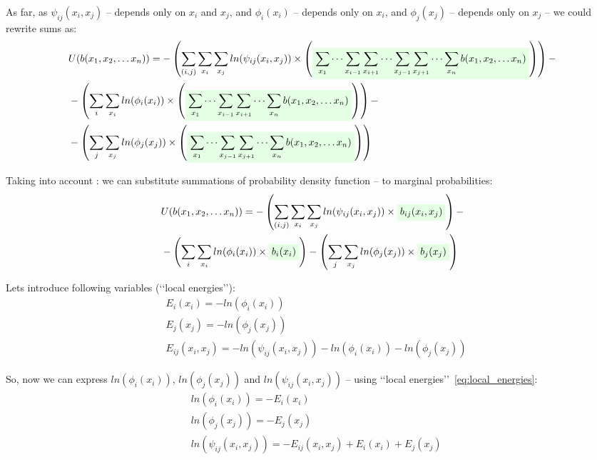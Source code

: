 \documentclass[fleqn,leqno]{article}
\newcommand{\highlight}[1]{\colorbox{green!10}{$\displaystyle#1$}}
\begin{document}
As far, as $\psi_{ij}(x_i, x_j)$ -- depends only on $x_i$ and $x_j$, and $\phi_{i}(x_i)$ -- depends only on $x_i$, and $\phi_{j}(x_j)$ -- depends only on $x_j$ -- we could rewrite sums as:
\begin{equation}
\begin{split}
   & U(b(x_1,x_2,\dots x_n)) = -\left( \sum_{(i, j)} \sum_{x_i} \sum_{x_j} ln(\psi_{ij}(x_i, x_j)) \times \left( \highlight{\sum_{x_1} \cdots \sum_{x_{i-1}} \sum_{x_{i+1}} \cdots \sum_{x_{j-1}} \sum_{x_{j+1}} \cdots \sum_{x_n}  b(x_1, x_2, \dots x_n)} \right) \right) - \\
   & -\left( \sum_{i} \sum_{x_i} ln(\phi_{i}(x_i)) \times \left( \highlight{\sum_{x_1} \cdots \sum_{x_{i-1}} \sum_{x_{i+1}} \cdots \sum_{x_n} b(x_1, x_2, \dots x_n)} \right) \right) - \\
   & -\left( \sum_{j} \sum_{x_j} ln(\phi_{j}(x_j)) \times \left( \highlight{\sum_{x_1} \cdots \sum_{x_{j-1}} \sum_{x_{j+1}} \cdots \sum_{x_n} b(x_1, x_2, \dots x_n)} \right) \right)
\end{split}
\end{equation}

Taking into account : we can substitute summations of probability density function -- to marginal probabilities:
\begin{equation}
\begin{split}
   & U(b(x_1,x_2,\dots x_n)) = -\left( \sum_{(i, j)} \sum_{x_i} \sum_{x_j} ln(\psi_{ij}(x_i, x_j)) \times \highlight{b_{ij}(x_i, x_j)} \right) - \\
   & -\left( \sum_{i} \sum_{x_i} ln(\phi_{i}(x_i)) \times \highlight{b_i(x_i)} \right) - \left( \sum_{j} \sum_{x_j} ln(\phi_{j}(x_j)) \times \highlight{b_j(x_j)} \right)
\end{split}
\end{equation}

Lets introduce following variables (\lq \lq local energies\rq \rq):
\begin{equation} \label{eq:local_energies}
\begin{split}
& E_i(x_i)    = -ln(\phi_i(x_i)) \\
& E_j(x_j)    = -ln(\phi_j(x_j)) \\
& E_{ij}(x_i, x_j) = -ln(\psi_{ij}(x_i, x_j)) -ln(\phi_i(x_i)) -ln(\phi_j(x_j))
\end{split}
\end{equation}

So, now we can express $ln(\phi_i(x_i))$, $ln(\phi_j(x_j))$ and $ln(\psi_{ij}(x_i, x_j))$ -- using \lq \lq local energies\rq \rq\ \eqref{eq:local_energies}:
\begin{equation} \label{eq:ln_potentials_as_local_energies}
\begin{split}
& ln(\phi_i(x_i))    = -E_i(x_i) \\
& ln(\phi_j(x_j))    = -E_j(x_j) \\
& ln(\psi_{ij}(x_i, x_j)) = -E_{ij}(x_i, x_j) + E_i(x_i) + E_j(x_j)
\end{split}
\end{equation}
\end{document}
